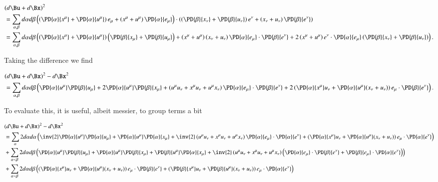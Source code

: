 \begin{align*}
&(d\Bu + d\Bx)^2 \\
&= 
\sum_{\alpha, \beta}
d\alpha 
d\beta 
\left( 
\left(
\PD{\alpha}{x^\mu} 
+
\PD{\alpha}{u^\mu} 
\right)
e_\mu
+
\left(
x^\mu
+
u^\mu
\right)
\PD{\alpha}{e_\mu} 
\right)
\cdot
\left( 
\left(
\PD{\beta}{x_\nu} 
+
\PD{\beta}{u_\nu} 
\right)
e^\nu
+
\left(
x_\nu
+
u_\nu
\right)
\PD{\beta}{e^\nu} 
\right) \\
&= 
\sum_{\alpha, \beta}
d\alpha 
d\beta 
\left(
\left(
\PD{\alpha}{x^\mu} 
+
\PD{\alpha}{u^\mu} 
\right)
\left(
\PD{\beta}{x_\mu} 
+
\PD{\beta}{u_\mu} 
\right)
+
\left(
x^\mu
+
u^\mu
\right)
\left(
x_\nu
+
u_\nu
\right)
\PD{\alpha}{e_\mu} 
\cdot
\PD{\beta}{e^\nu} 
+
2
\left(
x^\mu
+
u^\mu
\right)
e^\nu
\cdot
\PD{\alpha}{e_\mu} 
\left(
\PD{\beta}{x_\nu} 
+
\PD{\beta}{u_\nu} 
\right)
\right).
\end{align*}

Taking the difference we find

\begin{equation}\label{eqn:continuumL2:610}
\begin{aligned}
&(d\Bu + d\Bx)^2 - d\Bx^2 \\
&=
\sum_{\alpha, \beta}
d\alpha 
d\beta 
\left( 
\PD{\alpha}{u^\mu} 
\PD{\beta}{u_\mu} 
+
2
\PD{\alpha}{u^\mu} 
\PD{\beta}{x_\mu} 
+ 
\left(
u^\mu u_\nu 
+
x^\mu u_\nu 
+
u^\mu x_\nu 
\right)
\PD{\alpha}{e_\mu}
\cdot
\PD{\beta}{e^\nu} 
+
2 
\left(
\PD{\alpha}{x^\mu}
u_\nu
+
\PD{\alpha}{u^\mu}(
x_\nu
+
u_\nu
)
\right)
e_\mu \cdot 
\PD{\beta}{e^\nu}
\right).
\end{aligned}
\end{equation}

To evaluate this, it is useful, albeit messier, to group terms a bit

\begin{equation}\label{eqn:continuumL2:610b}
\begin{aligned}
&(d\Bu + d\Bx)^2 - d\Bx^2 \\
&=
\sum_{\alpha}
2 d\alpha 
d\alpha 
\left( 
\inv{2}
\PD{\alpha}{u^\mu} 
\PD{\alpha}{u_\mu} 
+
\PD{\alpha}{u^\mu} 
\PD{\alpha}{x_\mu} 
+ 
\inv{2}
\left(
u^\mu u_\nu 
+
x^\mu u_\nu 
+
u^\mu x_\nu 
\right)
\PD{\alpha}{e_\mu}
\cdot
\PD{\alpha}{e^\nu} 
+
\left(
\PD{\alpha}{x^\mu}
u_\nu
+
\PD{\alpha}{u^\mu}(
x_\nu
+
u_\nu
)
\right)
e_\mu \cdot 
\PD{\alpha}{e^\nu}
\right) \\
&+
\sum_{\alpha < \beta}
2 d\alpha 
d\beta 
\left( 
\PD{\alpha}{u^\mu} 
\PD{\beta}{u_\mu} 
+
\PD{\alpha}{u^\mu} 
\PD{\beta}{x_\mu} 
+
\PD{\beta}{u^\mu} 
\PD{\alpha}{x_\mu} 
+ 
\inv{2}
\left(
u^\mu u_\nu 
+
x^\mu u_\nu 
+
u^\mu x_\nu 
\right)
\left(
\PD{\alpha}{e_\mu}
\cdot
\PD{\beta}{e^\nu} 
+
\PD{\beta}{e_\mu}
\cdot
\PD{\alpha}{e^\nu} 
\right) 
\right) 
\\
&+
\sum_{\alpha < \beta}
2 d\alpha 
d\beta 
\left( 
\left(
\PD{\alpha}{x^\mu}
u_\nu
+
\PD{\alpha}{u^\mu}(
x_\nu
+
u_\nu
)
\right)
e_\mu \cdot 
\PD{\beta}{e^\nu}
+
\left(
\PD{\beta}{x^\mu}
u_\nu
+
\PD{\beta}{u^\mu}(
x_\nu
+
u_\nu
)
\right)
e_\mu \cdot 
\PD{\alpha}{e^\nu}
\right)
\end{aligned}
\end{equation}

